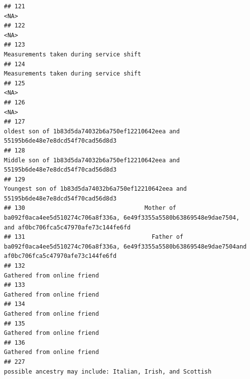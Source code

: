 \documentclass[]{article}
\begin{document}
\begin{verbatim}
## 121                                                                                                                                                <NA>
## 122                                                                                                                                                <NA>
## 123                                                                                                             Measurements taken during service shift
## 124                                                                                                             Measurements taken during service shift
## 125                                                                                                                                                <NA>
## 126                                                                                                                                                <NA>
## 127                                                                 oldest son of 1b83d5da74032b6a750ef12210642eea and 55195b6de48e7e8dcd54f70cad56d8d3
## 128                                                                 Middle son of 1b83d5da74032b6a750ef12210642eea and 55195b6de48e7e8dcd54f70cad56d8d3
## 129                                                               Youngest son of 1b83d5da74032b6a750ef12210642eea and 55195b6de48e7e8dcd54f70cad56d8d3
## 130                                  Mother of ba092f0aca4ee5d510274c706a8f336a, 6e49f3355a5580b63869548e9dae7504, and af0bc706fca5c47970afe73c144fe6fd
## 131                                    Father of ba092f0aca4ee5d510274c706a8f336a, 6e49f3355a5580b63869548e9dae7504and af0bc706fca5c47970afe73c144fe6fd
## 132                                                                                                                         Gathered from online friend
## 133                                                                                                                         Gathered from online friend
## 134                                                                                                                         Gathered from online friend
## 135                                                                                                                         Gathered from online friend
## 136                                                                                                                         Gathered from online friend
## 227                                                                                         possible ancestry may include: Italian, Irish, and Scottish

\end{verbatim}
\end{document}
